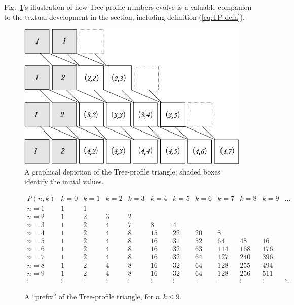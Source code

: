 Fig.~\ref{Fig:treeprofile}'s illustration of how Tree-profile numbers evolve is a valuable companion to the textual development in the section, including definition (\ref{eq:TP-defn}).
\begin{figure}[htb]
\begin{center}
        \includegraphics[scale=0.35]{FiguresMaths/TreeProfile}
        \caption{A graphical depiction of the Tree-profile triangle; shaded boxes identify the initial values.}
        \label{Fig:treeprofile}
\end{center}
\end{figure}

\begin{figure}[htb]
\[
\begin{array}{c||r|r|r|r|r|r|r|r|r|r|r}
P(n, k) & k=0 & k=1 & k=2 & k=3 & k=4 & k=5 & k=6 & k=7 & k=8 & k=9 & \ldots \\
\hline
\hline
n=1 &  1 &  1 &    &    &     &     &     &     &     &     \\
\hline
n=2 &  1 &  2 &  3 &  2 &     &     &     &     &     &     \\
\hline
n=3 &  1 &  2 &  4 &  7 &   8 &   4 &     &     &     &     \\
\hline
n=4 &  1 &  2 &  4 &  8 &  15 &  22 &  20 &   8 &     &     \\
\hline
n=5 &  1 &  2 &  4 &  8 &  16 &  31 &  52 &  64 & 48  &  16 \\
\hline
n=6 &  1 &  2 &  4 &  8 &  16 &  32 &  63 & 114 & 168 & 176 \\
\hline
n=7 &  1 &  2 &  4 &  8 &  16 &  32 &  64 & 127 & 240 & 396 \\
\hline
n=8 &  1 &  2 &  4 &  8 &  16 &  32 &  64 & 128 & 255 & 494 \\
\hline
n=9 &  1 &  2 &  4 &  8 &  16 &  32 &  64 & 128 & 256 & 511 \\
\hline
\vdots &\vdots &\vdots &\vdots &\vdots &\vdots &\vdots &\vdots &\vdots
&\vdots &\vdots &\ddots
\end{array}
\] 
\caption{A ``prefix'' of the Tree-profile triangle, for $n,k \leq 9$.}
\label{fig:TP-triangle}
\end{figure}


